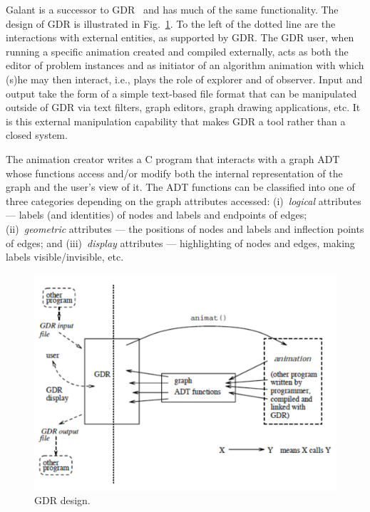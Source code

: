 Galant is a successor to
GDR~\cite{1991-TR_NCSU_CSC-Stallmann,1992-CSDM-Stallmann} and has much of the
same functionality.
The design of GDR is illustrated in Fig.~\ref{fig:gdr}.
To the left of the dotted line are the interactions with external entities,
as supported by GDR.
The GDR user, when running a specific animation created and compiled
externally, acts as both the editor of problem instances and as initiator of an
algorithm animation with which (s)he may then interact, i.e., plays the role
of explorer and of observer. 
Input and output take the form of a simple text-based file format that can be
manipulated outside of GDR via text filters, graph editors, graph drawing
applications, etc. It is this external manipulation capability
that makes GDR a tool rather than a
closed system.

The animation creator writes a C program that interacts with a graph ADT
whose functions access and/or modify both the internal representation of the
graph and the user's view of it. The ADT functions can be classified into one
of three categories depending on the graph attributes accessed:
(i)~\emph{logical} attributes --- labels (and identities) of nodes and labels
and endpoints of edges; (ii)~\emph{geometric} attributes --- the positions of
nodes and labels and
inflection points of edges; and (iii)~\emph{display} attributes ---
highlighting of nodes and edges, making labels visible/invisible, etc. 

\begin{figure}

\begin{center}
\includegraphics[scale=0.6]{X_gdr_design}
\end{center}

\caption{GDR design.}
\label{fig:gdr}
\end{figure}


